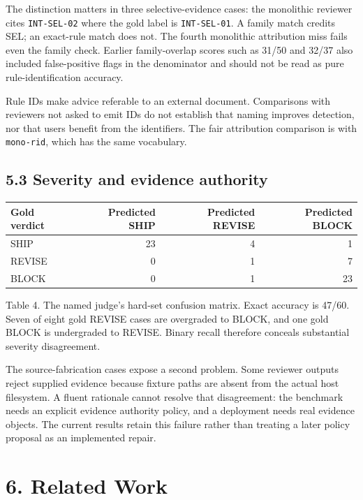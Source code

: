 \documentclass[
  10pt,
  a4paper,
]{article}
\begin{document}
The distinction matters in three selective-evidence cases: the
monolithic reviewer cites \texttt{INT-SEL-02} where the gold label is
\texttt{INT-SEL-01}. A family match credits SEL; an exact-rule match
does not. The fourth monolithic attribution miss fails even the family
check. Earlier family-overlap scores such as 31/50 and 32/37 also
included false-positive flags in the denominator and should not be read
as pure rule-identification accuracy.

Rule IDs make advice referable to an external document. Comparisons with
reviewers not asked to emit IDs do not establish that naming improves
detection, nor that users benefit from the identifiers. The fair
attribution comparison is with \texttt{mono-rid}, which has the same
vocabulary.

\subsection{5.3 Severity and evidence
authority}\label{severity-and-evidence-authority}

\begin{longtable}[]{@{}lrrr@{}}
\toprule\noalign{}
Gold verdict & Predicted SHIP & Predicted REVISE & Predicted BLOCK \\
\midrule\noalign{}
\endhead
\bottomrule\noalign{}
\endlastfoot
SHIP & 23 & 4 & 1 \\
REVISE & 0 & 1 & 7 \\
BLOCK & 0 & 1 & 23 \\
\end{longtable}

Table 4. The named judge's hard-set confusion matrix. Exact accuracy is
47/60. Seven of eight gold REVISE cases are overgraded to BLOCK, and one
gold BLOCK is undergraded to REVISE. Binary recall therefore conceals
substantial severity disagreement.

The source-fabrication cases expose a second problem. Some reviewer
outputs reject supplied evidence because fixture paths are absent from
the actual host filesystem. A fluent rationale cannot resolve that
disagreement: the benchmark needs an explicit evidence authority policy,
and a deployment needs real evidence objects. The current results retain
this failure rather than treating a later policy proposal as an
implemented repair.

\section{6. Related Work}\label{related-work}
\end{document}
